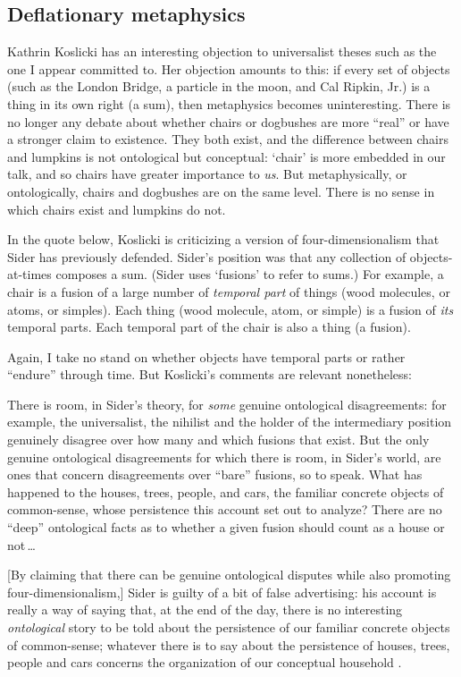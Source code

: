\documentclass[12pt,twoside]{reedfancy}
\newenvironment{squote}{%
	\begin{spacing}{1}
	\begin{list}{}{%
	\setlength{\labelwidth}{0pt}%
	\rightmargin\leftmargin%
	}
	\item\relax
	}{%
	\end{list}%
	\end{spacing}
	}
\begin{document}
\begin{spacing}{1.25}
\subsection{Deflationary metaphysics}
\label{deflate}
Kathrin Koslicki has an interesting objection to universalist theses
such as the one I appear committed to.  Her objection amounts to this:
if every set of objects (such as the London Bridge, a particle in the
moon, and Cal Ripkin, Jr.) is a thing in its own right (a sum), then
metaphysics becomes uninteresting.  There is no longer any debate
about whether chairs or dogbushes are more ``real'' or have a stronger
claim to existence.  They both exist, and the difference between
chairs and lumpkins is not ontological but conceptual: `chair' is more
embedded in our talk, and so chairs have greater importance to {\em
  us}.  But metaphysically, or ontologically, chairs and dogbushes are
on the same level.  There is no sense in which chairs exist and
lumpkins do not.

In the quote below, Koslicki is criticizing a version of
four-dimensionalism that Sider has previously defended.  Sider's
position was that any collection of objects-at-times composes a sum.
(Sider uses `fusions' to refer to sums.)  For example, a chair is a
fusion of a large number of {\em temporal part} of things (wood
molecules, or atoms, or simples).  Each thing (wood molecule, atom, or
simple) is a fusion of {\em its} temporal parts.  Each temporal part
of the chair is also a thing (a fusion).

Again, I take no stand on whether objects have temporal parts or
rather ``endure'' through time.  But Koslicki's comments are relevant
nonetheless:

\begin{squote}
There is room, in Sider's theory, for {\em some} genuine ontological
disagreements: for example, the universalist, the nihilist and the
holder of the intermediary position genuinely disagree over how many
and which fusions that exist.  But the only genuine ontological
disagreements for which there is room, in Sider's world, are ones that
concern disagreements over ``bare'' fusions, so to speak.  What has
happened to the houses, trees, people, and cars, the familiar concrete
objects of common-sense, whose persistence this account set out to
analyze?  There are no ``deep'' ontological facts as to whether a
given fusion should count as a house or not\,\ldots

[By claiming that there can be genuine ontological disputes while also
  promoting four-dimensionalism,] Sider is guilty of a bit of false
advertising: his account is really a way of saying that, at the end of
the day, there is no interesting {\em ontological} story to be told
about the persistence of our familiar concrete objects of
common-sense; whatever there is to say about the persistence of
houses, trees, people and cars concerns the organization of our
conceptual household \citeyearpar[124--125]{koslicki2003}.
\end{squote}


\end{spacing}
\end{document}
